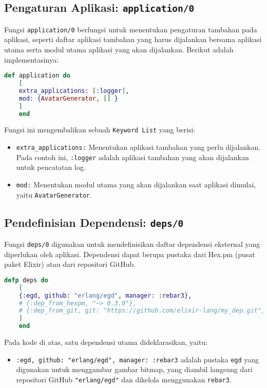 \subsection{Pengaturan Aplikasi: \texttt{application/0}}

Fungsi \texttt{application/0} berfungsi untuk menentukan pengaturan tambahan pada aplikasi, seperti daftar aplikasi tambahan yang harus dijalankan bersama aplikasi utama serta modul utama aplikasi yang akan dijalankan. Berikut adalah implementasinya:

\begin{lstlisting}[language=elixir]
	def application do
	[
	extra_applications: [:logger],
	mod: {AvatarGenerator, [] }
	]
	end
\end{lstlisting}

Fungsi ini mengembalikan sebuah \texttt{Keyword List} yang berisi:

\begin{itemize}
	\item \texttt{extra\_applications:} Menentukan aplikasi tambahan yang perlu dijalankan. Pada contoh ini, \texttt{:logger} adalah aplikasi tambahan yang akan dijalankan untuk pencatatan log.
	\item \texttt{mod:} Menentukan modul utama yang akan dijalankan saat aplikasi dimulai, yaitu \texttt{AvatarGenerator}.
\end{itemize}

\subsection{Pendefinisian Dependensi: \texttt{deps/0}}

Fungsi \texttt{deps/0} digunakan untuk mendefinisikan daftar dependensi eksternal yang diperlukan oleh aplikasi. Dependensi dapat berupa pustaka dari Hex.pm (pusat paket Elixir) atau dari repositori GitHub.

\begin{lstlisting}[language=elixir]
	defp deps do
	[
	{:egd, github: "erlang/egd", manager: :rebar3},
	# {:dep_from_hexpm, "~> 0.3.0"},
	# {:dep_from_git, git: "https://github.com/elixir-lang/my_dep.git", tag: "0.1.0"}
	]
	end
\end{lstlisting}

Pada kode di atas, satu dependensi utama dideklarasikan, yaitu:

\begin{itemize}
	\item \texttt{:egd, github: "erlang/egd", manager: :rebar3} adalah pustaka \texttt{egd} yang digunakan untuk menggambar gambar bitmap, yang diambil langsung dari repositori GitHub \texttt{"erlang/egd"} dan dikelola menggunakan \texttt{rebar3}.
\end{itemize}

